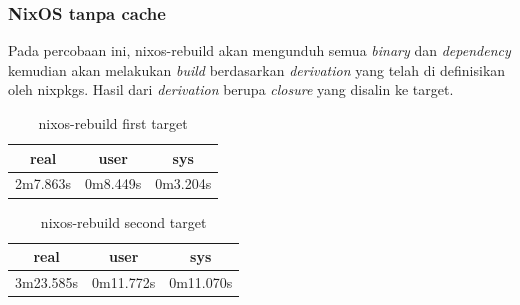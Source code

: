 \documentclass[10pt,]{report}
\begin{document}
\begin{adjustwidth}{20pt}{}
	\subsubsection{NixOS tanpa cache}
	\begin{adjustwidth}{20pt}{}
		Pada percobaan ini, nixos-rebuild akan mengunduh semua \textit{binary} dan
		\textit{dependency} kemudian akan melakukan \textit{build} berdasarkan
		\textit{derivation} yang telah di definisikan oleh nixpkgs. Hasil dari
		\textit{derivation} berupa \textit{closure} yang disalin ke target.
	\end{adjustwidth}
	\vspace{-3mm}
	\begin{table}[H]
		\begin{center}
			\begin{tabular}[c]{|c|c|c|}
				\hline
				\multicolumn{1}{|c|}{\textbf{real}} &
				\multicolumn{1}{c|}{\textbf{user}}  &
				\multicolumn{1}{c|}{\textbf{sys}}                         \\
				\hline
				2m7.863s                            & 0m8.449s & 0m3.204s \\
				\hline
			\end{tabular}
		\end{center}
		\caption{nixos-rebuild first target}
	\end{table}
	\vspace{-3mm}
	\begin{table}[H]
		\begin{center}
			\begin{tabular}[c]{|c|c|c|}
				\hline
				\multicolumn{1}{|c|}{\textbf{real}} &
				\multicolumn{1}{c|}{\textbf{user}}  &
				\multicolumn{1}{c|}{\textbf{sys}}                           \\
				\hline
				3m23.585s                           & 0m11.772s & 0m11.070s \\
				\hline
			\end{tabular}
		\end{center}
		\caption{nixos-rebuild second target}
	\end{table}

\end{adjustwidth}
\end{document}
